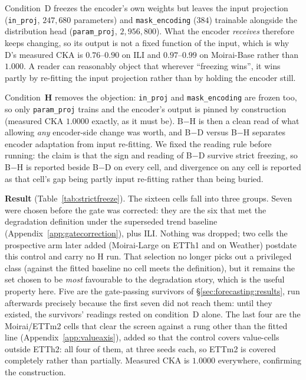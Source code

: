 Condition~D freezes the encoder's own weights but leaves the input projection
(\texttt{in\_proj}, $247{,}680$ parameters) and \texttt{mask\_encoding} ($384$)
trainable alongside the distribution head (\texttt{param\_proj},
$2{,}956{,}800$). What the encoder \emph{receives} therefore keeps changing, so
its output is not a fixed function of the input, which is why D's measured CKA
is $0.76$--$0.90$ on ILI and $0.97$--$0.99$ on Moirai-Base rather than
$1.000$. A reader can reasonably object that wherever ``freezing wins'', it
wins partly by re-fitting the input projection rather than by holding the
encoder still.

Condition~\textbf{H} removes the objection: \texttt{in\_proj} and
\texttt{mask\_encoding} are frozen too, so only \texttt{param\_proj} trains and
the encoder's output is pinned by construction (measured CKA $1.0000$ exactly,
as it must be). B$-$H is then a clean read of what allowing \emph{any}
encoder-side change was worth, and B$-$D versus B$-$H separates encoder
adaptation from input re-fitting. We fixed the reading rule before running: the
claim is that the sign and reading of B$-$D survive strict freezing, so B$-$H
is reported beside B$-$D on every cell, and divergence on any cell is reported
as that cell's gap being partly input re-fitting rather than being buried.

\textbf{Result} (Table~\ref{tab:strictfreeze}). The sixteen cells fall into
three groups. Seven were chosen before the gate was corrected: they are the six
that met the degradation
definition under the superseded trend baseline
(Appendix~\ref{app:gatecorrection}), plus ILI. Nothing was dropped; two cells
the prospective arm later added (Moirai-Large on ETTh1 and on Weather) postdate
this control and carry no H run. That selection no longer picks out a privileged
class (against the fitted baseline no cell meets the definition), but it
remains the set chosen to be \emph{most} favourable to the degradation story,
which is the useful property here. Five are the gate-passing
survivors of \S\ref{sec:forecasting:results}, run afterwards precisely because
the first seven did not reach them: until they existed, the survivors' readings
rested on condition~D alone. The last four are the Moirai/ETTm2 cells that clear
the screen against a rung other than the fitted line
(Appendix~\ref{app:valueaxis}), added so that the control covers value-cells
outside ETTh2: all four of them, at three seeds each, so ETTm2 is covered
completely rather than partially. Measured CKA is
$1.0000$ everywhere, confirming the construction.

